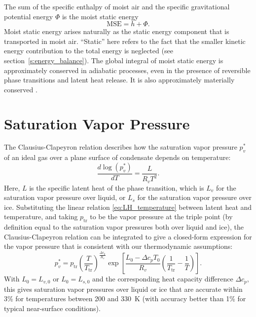 \documentclass{report}
\begin{document}
The sum of the specific enthalpy of moist air and the specific gravitational potential energy $\Phi$ is the moist static energy \citep{Neelin87a}
\begin{equation}\label{e:MSE}
\mathrm{MSE} = h + \Phi.
\end{equation}
Moist static energy arises naturally as the static energy component that is transported in moist air. ``Static'' here refers to the fact that the smaller kinetic energy contribution to the total energy is neglected (see section~\ref{s:energy_balance}). The global integral of moist static energy is approximately conserved in adiabatic processes, even in the presence of reversible phase transitions and latent heat release. It is also approximately materially conserved \citep{Romps15b}. 

\section{Saturation Vapor Pressure}

The Clausius-Clapeyron relation describes how the saturation vapor pressure $p_v^*$ of an ideal gas over a plane surface of condensate depends on temperature:
\begin{equation}\label{e:Clausius_Clapeyron}
    \frac{d \log(p_v^*)}{dT} = \frac{L}{R_v T^2}.
\end{equation}
Here, $L$ is the specific latent heat of the phase transition, which is $L_v$ for the saturation vapor pressure over liquid, or $L_s$ for the saturation vapor pressure over ice. Substituting the linear relation \eqref{eq:LH_temperature} between latent heat and temperature, and taking $p_\mathrm{tr}$ to be the vapor pressure at the triple point (by definition equal to the saturation vapor pressures both over liquid and ice), the Clausius-Clapeyron relation can be integrated to give a closed-form expression for the vapor pressure that is consistent with our thermodynamic assumptions:
\begin{equation}
    p_v^* = p_{\mathrm{tr}} \left( \frac{T}{T_{\mathrm{tr}}} \right)^{\frac{\Delta c_p}{R_v}}
        \exp \left[ \frac{L_0 - \Delta c_p T_0}{R_v} 
        \left( \frac{1}{T_{\mathrm{tr}}} - \frac{1}{T} \right) \right].
        \label{eq:sat_vapor_pressure}
\end{equation}
With $L_0 = L_{v,0}$ or $L_0 = L_{s,0}$ and the corresponding heat capacity difference $\Delta c_p$, this gives saturation vapor pressures over liquid or ice that are accurate within 3\% for temperatures between 200 and 330~K (with accuracy better than 1\% for typical near-surface conditions).
\end{document}
